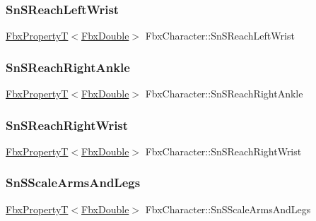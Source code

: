 \subsubsection{\texorpdfstring{Sn\+S\+Reach\+Left\+Wrist}{SnSReachLeftWrist}}
{\footnotesize\ttfamily \hyperlink{class_fbx_property_t}{Fbx\+PropertyT}$<$\hyperlink{fbxtypes_8h_a171e72a1c46fc15c1a6c9c31948c1c5b}{Fbx\+Double}$>$ Fbx\+Character\+::\+Sn\+S\+Reach\+Left\+Wrist}

\mbox{\label{class_fbx_character_a7c55eeeda37b29ec7c71c5f7ca1b9e22}} 
\subsubsection{\texorpdfstring{Sn\+S\+Reach\+Right\+Ankle}{SnSReachRightAnkle}}
{\footnotesize\ttfamily \hyperlink{class_fbx_property_t}{Fbx\+PropertyT}$<$\hyperlink{fbxtypes_8h_a171e72a1c46fc15c1a6c9c31948c1c5b}{Fbx\+Double}$>$ Fbx\+Character\+::\+Sn\+S\+Reach\+Right\+Ankle}

\mbox{\label{class_fbx_character_a5525370c57690845887d0953338678df}} 
\subsubsection{\texorpdfstring{Sn\+S\+Reach\+Right\+Wrist}{SnSReachRightWrist}}
{\footnotesize\ttfamily \hyperlink{class_fbx_property_t}{Fbx\+PropertyT}$<$\hyperlink{fbxtypes_8h_a171e72a1c46fc15c1a6c9c31948c1c5b}{Fbx\+Double}$>$ Fbx\+Character\+::\+Sn\+S\+Reach\+Right\+Wrist}

\mbox{\label{class_fbx_character_a026d173105210ef46e2ba1ba1c6590ca}} 
\subsubsection{\texorpdfstring{Sn\+S\+Scale\+Arms\+And\+Legs}{SnSScaleArmsAndLegs}}
{\footnotesize\ttfamily \hyperlink{class_fbx_property_t}{Fbx\+PropertyT}$<$\hyperlink{fbxtypes_8h_a171e72a1c46fc15c1a6c9c31948c1c5b}{Fbx\+Double}$>$ Fbx\+Character\+::\+Sn\+S\+Scale\+Arms\+And\+Legs}

